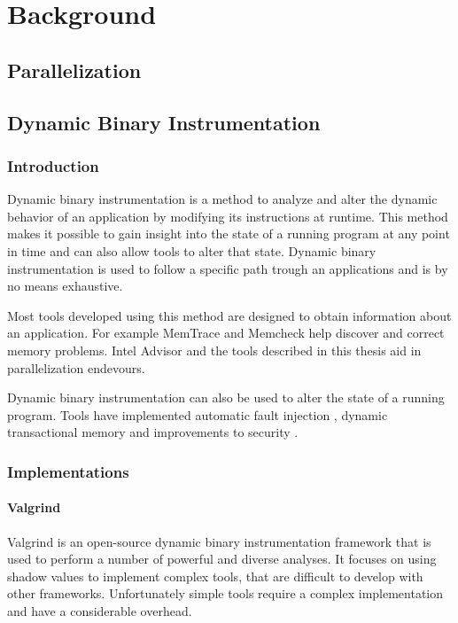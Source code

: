 \chapter{Background}

\section {Parallelization}

\section {Dynamic Binary Instrumentation}

\subsection{Introduction}

Dynamic binary instrumentation is a method to analyze and alter the dynamic behavior of an application by modifying its instructions at runtime. This method makes it possible to gain insight into the state of a running program at any point in time and can also allow tools to alter that state. Dynamic binary instrumentation is used to follow a specific path trough an applications and is by no means exhaustive.

Most tools developed using this method are designed to obtain information about an application. For example MemTrace \cite{pindoc} and Memcheck \cite{memcheck} help discover and correct memory problems. Intel Advisor \cite{inteladvisor} and the tools described in this thesis aid in parallelization endevours.

Dynamic binary instrumentation can also be used to alter the state of a running program. Tools have implemented automatic fault injection \cite{faultinject}, dynamic transactional memory \cite{dynamicstm} and improvements to security \cite{dynamicstackprotect}.

\subsection{Implementations}

\subsubsection{Valgrind}

Valgrind \cite{valgrind} is an open-source dynamic binary instrumentation framework that is used to perform a number of powerful and diverse analyses. It focuses on using shadow values to implement complex tools, that are difficult to develop with other frameworks. Unfortunately simple tools require a complex implementation and have a considerable overhead.

